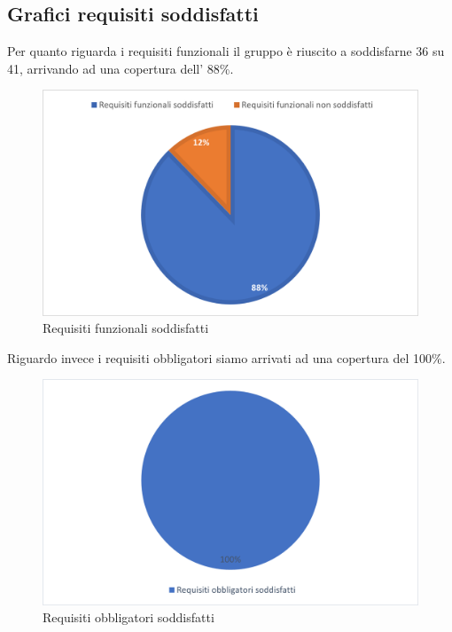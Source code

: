 \subsection{Grafici requisiti soddisfatti}
Per quanto riguarda i requisiti funzionali il gruppo \groupName{} è riuscito a soddisfarne 36 su 41, arrivando ad una copertura dell' 88\%.
\begin{figure}[htbp]
    \begin{center}
     \includegraphics{immagini/requisitiFunzionali.png}
     \caption{Requisiti funzionali soddisfatti}
    \end{center}
 \end{figure}    
 

Riguardo invece i requisiti obbligatori siamo arrivati ad una copertura del 100\%.
\begin{figure}[htbp]
   \begin{center}
    \includegraphics{immagini/requisiti_obbligatori.png}
    \caption{Requisiti obbligatori soddisfatti}
   \end{center}
\end{figure}    


